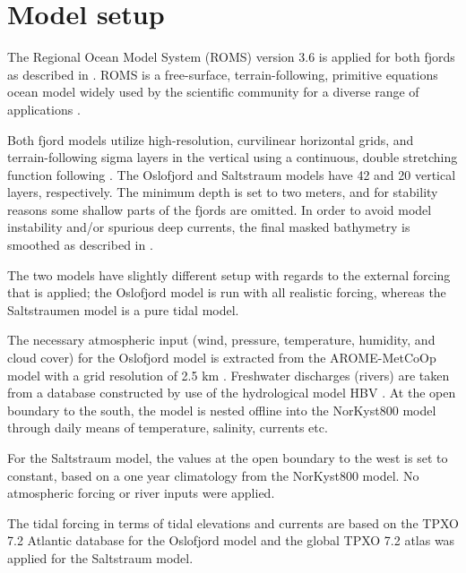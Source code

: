 \section{Model setup}

The Regional Ocean Model System (ROMS) version 3.6 is applied for both fjords as described in \cite{roed16}. ROMS is a free-surface, terrain-following, primitive equations ocean model widely used by the scientific community for a diverse range of applications \cite[]{shchepetkin05,shchepetkin09,haidvogel08}. 

Both fjord models utilize high-resolution, curvilinear horizontal grids, and terrain-following sigma layers in the vertical using a continuous, double stretching function following \cite{shchepetkin09}. The Oslofjord and Saltstraum models have 42 and 20 vertical layers, respectively. The minimum depth is set to two meters, and for stability reasons some shallow parts of the fjords are omitted. In order to avoid model instability and/or spurious deep currents, the final masked bathymetry is smoothed as described in \cite{roed16}.



The two models have slightly different setup with regards to the external forcing that is applied; the Oslofjord model is run with all realistic forcing, whereas the Saltstraumen model is a pure tidal model. 

The necessary atmospheric input (wind, pressure, temperature, humidity, and cloud cover) for the Oslofjord model is extracted from the AROME-MetCoOp model with a grid resolution of 2.5 km \cite[]{muller2015}. Freshwater discharges (rivers) are taken from a database constructed by use of the hydrological model HBV \cite[]{beldring2003}. At the open boundary to the south, the model is nested offline into the NorKyst800 model \cite[]{albretsen11} through daily means of temperature, salinity, currents etc.

For the Saltstraum model, the values at the open boundary to the west is set to constant, based on a one year climatology from the NorKyst800 model. No atmospheric forcing or river inputs were applied.

The tidal forcing in terms of tidal elevations and currents are based on the TPXO 7.2 Atlantic database \cite[]{egbert02} for the Oslofjord model and the global TPXO 7.2 atlas was applied for the Saltstraum model. 
